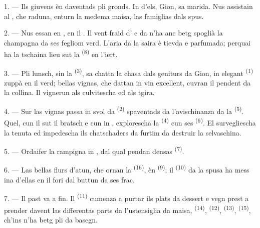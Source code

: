\VUsaut{4.0mm}
\VUsaut{1.6mm}
\VUsaut{3.2mm}

\VUsaut{1.6mm}
\VUsaut{2.6mm}

\VUsaut{3.0mm}

1. --- Ils giuvens èn daventads pli gronds. In d'els, Gion, sa marida. Nus
assistain al , che raduna, enturn la medema maisa, las
famiglias dals spus.

2. --- Nus essan en , en il . Il vent fraid
d' e da  n'ha anc betg spoglià la champagna da ses
fegliom verd. L'aria da la saira è tievda e parfumada; perquai ha la tschaina lieu
sut la  \textsuperscript{(8)} en l'iert.

3. --- Pli lunsch, sin la  \textsuperscript{(3)}, sa chatta la chasa
dals geniturs da Gion, in elegant  \textsuperscript{(1)} zuppà en il verd;
bellas vignas, che dattan in vin excellent, cuvran il pendent da la collina. Il
vignerun als culvitescha ed als tgira.

4. --- Sur las vignas passa in svol da  \textsuperscript{(2)}
spaventads da l'avischinanza da la  \textsuperscript{(5)}.
Quel, cun il  sut il bratsch e cun in , explorescha la  \textsuperscript{(4)} cun ses
 \textsuperscript{(6)}. El survegliescha la tenuta ed impedescha ils
chatschaders da furtim da destruir la selvaschina.

5. --- Ordaifer la  rampigna in , dal qual
pendan densas  \textsuperscript{(7)}.

6. --- Las bellas flurs d'atun, che ornan la  \textsuperscript{(16)}, èn
 \textsuperscript{(9)}; il  \textsuperscript{(10)} da la
spusa ha mess ina d'ellas en il fori dal buttun da ses frac.

7. --- Il past va a fin. Il  \textsuperscript{(11)} cumenza a purtar
ils plats da dessert e vegn prest a prender davent las differentas parts da
l'ustensiglia da maisa,  \textsuperscript{(14)}, 
\textsuperscript{(12)},  \textsuperscript{(13)}, 
\textsuperscript{(15)}, ch'ins n'ha betg pli da basegn.

